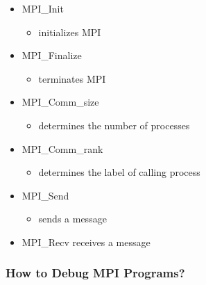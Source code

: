 \begin{itemize}
\tightlist
\item
  MPI\_Init

  \begin{itemize}
  \tightlist
  \item
    initializes MPI
  \end{itemize}
\item
  MPI\_Finalize

  \begin{itemize}
  \tightlist
  \item
    terminates MPI
  \end{itemize}
\item
  MPI\_Comm\_size

  \begin{itemize}
  \tightlist
  \item
    determines the number of processes
  \end{itemize}
\item
  MPI\_Comm\_rank

  \begin{itemize}
  \tightlist
  \item
    determines the label of calling process
  \end{itemize}
\item
  MPI\_Send

  \begin{itemize}
  \tightlist
  \item
    sends a message
  \end{itemize}
\item
  MPI\_Recv receives a message
\end{itemize}

\hypertarget{how-to-debug-mpi-programs}{%
\subsubsection{How to Debug MPI
Programs?}\label{how-to-debug-mpi-programs}}

